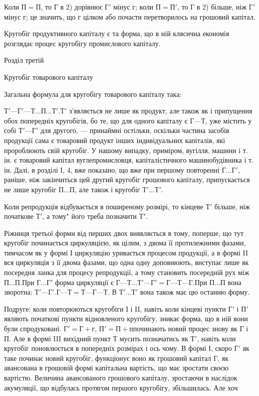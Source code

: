 Коли $П = П$, то Г в 2) дорівнює $Г'$ мінус г; коли $П = П'$, то Г в 2)
більше, ніж $Г'$ мінус г; це значить, що г цілком або почасти перетворилось
на грошовий капітал.

Кругобіг продуктивного капіталу є та форма, що в ній клясична
економія розглядає процес кругобігу промислового капіталу.

Розділ третій

Кругобіг товарового капіталу

Загальна формула для кругобігу товарового капіталу така:

$Т' — Г' — Т... П... Т'.

Т'$ з’являється не лише як продукт, але також як і припущення обох
попередніх кругобігів, бо те, що для одного капіталу є $Г — Т$, уже містить
у собі $Т' — Г'$ для другого, — принаймні остільки, оскільки частина засобів
продукції сама є товаровий продукт інших індивідуальних капіталів,
які пророблюють свій кругобіг. У нашому випадку, приміром,
вугілля, машини і т. ін. є товаровий капітал вуглепромисловця, капіталістичного
машинобудівника і т. ін. Далі, в розділі І, 4, вже показано,
що вже при першому повторенні $Г... Г'$, раніше, ніж закінчиться цей
другий кругобіг грошового капіталу, припускається не лише кругобіг
$П... П$, але також і кругобіг $Т'... Т'$.

Коли репродукція відбувається в поширеному розмірі, то кінцеве $Т'$
більше, ніж початкове $Т'$, а тому" його треба позначити Т".

Ріжниця третьої форми від перших двох виявляється в тому, поперше,
що тут кругобіг починається циркуляцією, як цілим, з двома її протилежними
фазами, тимчасом як у формі І циркуляцію уривається процесом
продукції, а в формі II вся циркуляція з її двома фазами, що одна одну
доповнюють, виступає лише як посередня ланка для процесу репродукції,
а тому становить посередній рух між $П... П. П$ри $Г... Г'$ форма
циркуляції є $Г — Т... Т' — Г' = Г — Т — Г. П$ри $П... П$ вона зворотна:
$Т' — Г'. Г — Т = Т — Г — Т$. В $Т'... Т'$ вона також має цю останню
форму.

Подруге: коли повторюються кругобіги І і II, навіть коли кінцеві
пункти $Г'$ і $П'$ являють початкові пункти відновленого кругобігу, зникає
форма, що в ній вони були спродуковані. $Г' = Г + г$, $П' = П + п п$очинають
новий процес знову як Г і П. Але в формі III вихідний пункт Т
мусить позначатись як $Т'$, навіть коли кругобіг поновлюється в попередніх
розмірах і ось чому. В формі І, скоро $Г'$ як таке починає новий
кругобіг, функціонує воно як грошовий капітал Г, як авансована в грошовій
формі капітальна вартість, що має зростати своєю вартістю.
Величина авансованого грошового капіталу, зростаючи в наслідок акумуляції,
що відбулась протягом першого кругобігу, збільшилась. Але хоч
\parbreak{}  %
